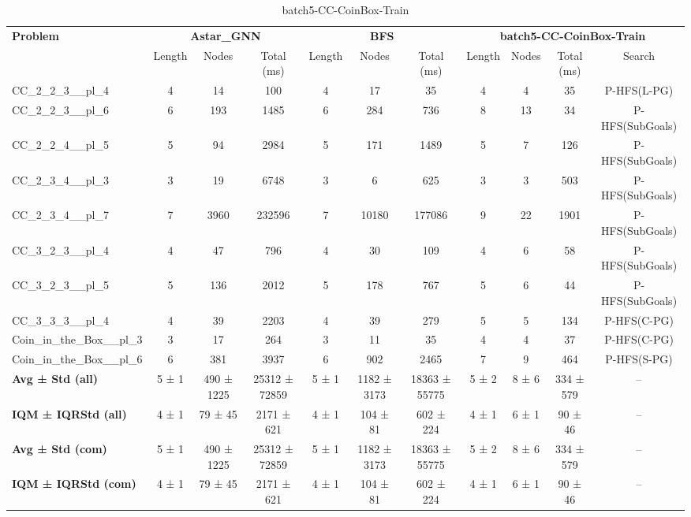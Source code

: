 \begin{table}[!ht]
\centering
\scriptsize
\begin{tabular}{l|ccc|ccc|cccc}
\multirow{2}{*}{\textbf{Problem}} & \multicolumn{3}{c|}{\textbf{Astar\_GNN}} & \multicolumn{3}{c|}{\textbf{BFS}} & \multicolumn{4}{c}{\textbf{batch5-CC-CoinBox-Train}} \\
\cline{2-11}
& Length & Nodes & Total (ms) & Length & Nodes & Total (ms) & Length & Nodes & Total (ms) & Search \\
\hline
CC\_2\_2\_3\_\_pl\_4 & 4 & 14 & 100 & 4 & 17 & 35 & 4 & 4 & 35 & P-HFS(L-PG) \\
CC\_2\_2\_3\_\_pl\_6 & 6 & 193 & 1485 & 6 & 284 & 736 & 8 & 13 & 34 & P-HFS(SubGoals) \\
CC\_2\_2\_4\_\_pl\_5 & 5 & 94 & 2984 & 5 & 171 & 1489 & 5 & 7 & 126 & P-HFS(SubGoals) \\
CC\_2\_3\_4\_\_pl\_3 & 3 & 19 & 6748 & 3 & 6 & 625 & 3 & 3 & 503 & P-HFS(SubGoals) \\
CC\_2\_3\_4\_\_pl\_7 & 7 & 3960 & 232596 & 7 & 10180 & 177086 & 9 & 22 & 1901 & P-HFS(SubGoals) \\
CC\_3\_2\_3\_\_pl\_4 & 4 & 47 & 796 & 4 & 30 & 109 & 4 & 6 & 58 & P-HFS(SubGoals) \\
CC\_3\_2\_3\_\_pl\_5 & 5 & 136 & 2012 & 5 & 178 & 767 & 5 & 6 & 44 & P-HFS(SubGoals) \\
CC\_3\_3\_3\_\_pl\_4 & 4 & 39 & 2203 & 4 & 39 & 279 & 5 & 5 & 134 & P-HFS(C-PG) \\
Coin\_in\_the\_Box\_\_pl\_3 & 3 & 17 & 264 & 3 & 11 & 35 & 4 & 4 & 37 & P-HFS(C-PG) \\
Coin\_in\_the\_Box\_\_pl\_6 & 6 & 381 & 3937 & 6 & 902 & 2465 & 7 & 9 & 464 & P-HFS(S-PG) \\
\hline
\textbf{Avg ± Std (all)} & 5 ± 1 & 490 ± 1225 & 25312 ± 72859 & 5 ± 1 & 1182 ± 3173 & 18363 ± 55775 & 5 ± 2 & 8 ± 6 & 334 ± 579 & -- \\
\textbf{IQM ± IQRStd (all)} & 4 ± 1 & 79 ± 45 & 2171 ± 621 & 4 ± 1 & 104 ± 81 & 602 ± 224 & 4 ± 1 & 6 ± 1 & 90 ± 46 & -- \\
\textbf{Avg ± Std (com)} & 5 ± 1 & 490 ± 1225 & 25312 ± 72859 & 5 ± 1 & 1182 ± 3173 & 18363 ± 55775 & 5 ± 2 & 8 ± 6 & 334 ± 579 & -- \\
\textbf{IQM ± IQRStd (com)} & 4 ± 1 & 79 ± 45 & 2171 ± 621 & 4 ± 1 & 104 ± 81 & 602 ± 224 & 4 ± 1 & 6 ± 1 & 90 ± 46 & -- \\
\end{tabular}
\caption{batch5-CC-CoinBox-Train}
\label{tab:batch5_CC-CoinBox_comparison_train}
\end{table}

